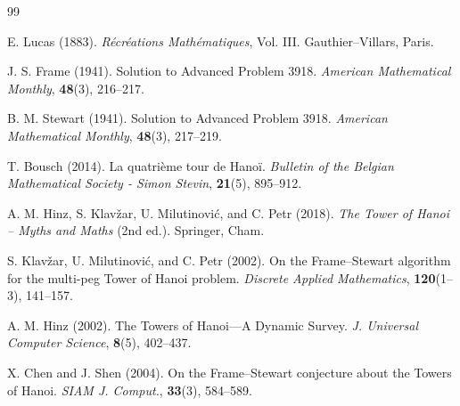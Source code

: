 \documentclass[11pt]{article}
\theoremstyle{definition}
\begin{document}
\begin{thebibliography}{99}

E. Lucas (1883).
\newblock \emph{Récréations Mathématiques}, Vol. III.
\newblock Gauthier--Villars, Paris.

J. S. Frame (1941).
\newblock Solution to Advanced Problem 3918.
\newblock \emph{American Mathematical Monthly}, \textbf{48}(3), 216--217.

B. M. Stewart (1941).
\newblock Solution to Advanced Problem 3918.
\newblock \emph{American Mathematical Monthly}, \textbf{48}(3), 217--219.

T. Bousch (2014).
\newblock La quatrième tour de Hanoï.
\newblock \emph{Bulletin of the Belgian Mathematical Society - Simon Stevin}, \textbf{21}(5), 895--912.

A. M. Hinz, S. Klavžar, U. Milutinović, and C. Petr (2018).
\newblock \emph{The Tower of Hanoi -- Myths and Maths} (2nd ed.).
\newblock Springer, Cham.

S. Klavžar, U. Milutinović, and C. Petr (2002).
\newblock On the Frame--Stewart algorithm for the multi-peg Tower of Hanoi problem.
\newblock \emph{Discrete Applied Mathematics}, \textbf{120}(1--3), 141--157.

A. M. Hinz (2002).
\newblock The Towers of Hanoi---A Dynamic Survey.
\newblock \emph{J. Universal Computer Science}, \textbf{8}(5), 402--437.

X. Chen and J. Shen (2004).
\newblock On the Frame--Stewart conjecture about the Towers of Hanoi.
\newblock \emph{SIAM J. Comput.}, \textbf{33}(3), 584--589.

\end{thebibliography}
\end{document}
